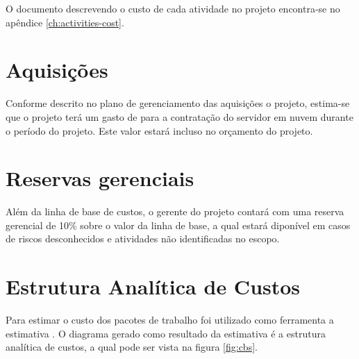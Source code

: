 O documento descrevendo o custo de cada atividade no projeto encontra-se no apêndice \ref{ch:activities-cost}.

\section{Aquisições}

Conforme descrito no plano de gerenciamento das aquisições o projeto, estima-se que o projeto terá um gasto de \procurementBudget{} para a contratação do servidor em nuvem durante o período do projeto. Este valor estará incluso no orçamento do projeto.

\section{Reservas gerenciais}
\label{ch:management-budget}

Além da linha de base de custos, o gerente do projeto contará com uma reserva gerencial de 10\% sobre o valor da linha de base, a qual estará diponível em casos de riscos desconhecidos e atividades não identificadas no escopo.

\section{Estrutura Analítica de Custos}

Para estimar o custo dos pacotes de trabalho foi utilizado como ferramenta a estimativa . O diagrama gerado como resultado da estimativa é a estrutura analítica de custos, a qual pode ser vista na figura \ref{fig:cbs}.

